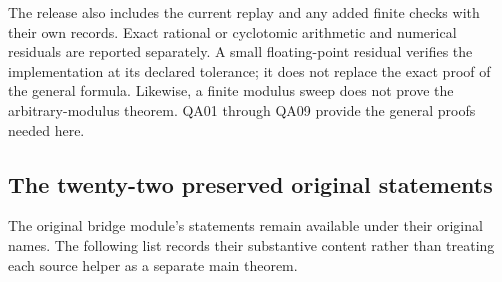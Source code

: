 The release also includes the current replay and any added finite checks
with their own records. Exact rational or cyclotomic arithmetic and
numerical residuals are reported separately. A small floating-point
residual verifies the implementation at its declared tolerance; it does
not replace the exact proof of the general formula. Likewise, a finite
modulus sweep does not prove the arbitrary-modulus theorem. QA01 through
QA09 provide the general proofs needed here.

\hypertarget{the-twenty-two-preserved-original-statements}{%
\subsection{The twenty-two preserved original
statements}\label{the-twenty-two-preserved-original-statements}}

The original bridge module's statements remain available under their
original names. The following list records their substantive content
rather than treating each source helper as a separate main theorem.

